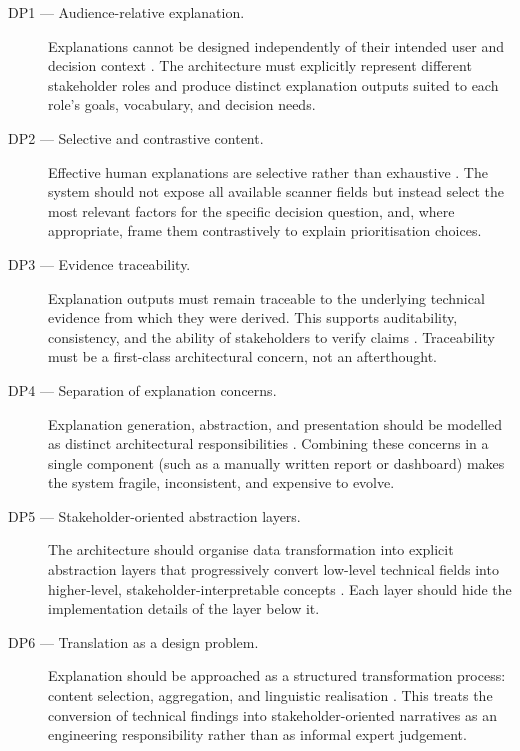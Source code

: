 \begin{description}

  \item[DP1 — Audience-relative explanation.] Explanations cannot be designed independently of their intended user and decision context \cite{doshivelez2017rigorous, lipton2018mythos}. The architecture must explicitly represent different stakeholder roles and produce distinct explanation outputs suited to each role's goals, vocabulary, and decision needs.

  \item[DP2 — Selective and contrastive content.] Effective human explanations are selective rather than exhaustive \cite{miller2019explanation}. The system should not expose all available scanner fields but instead select the most relevant factors for the specific decision question, and, where appropriate, frame them contrastively to explain prioritisation choices.

  \item[DP3 — Evidence traceability.] Explanation outputs must remain traceable to the underlying technical evidence from which they were derived. This supports auditability, consistency, and the ability of stakeholders to verify claims \cite{bass2012software, wachter2017counterfactual}. Traceability must be a first-class architectural concern, not an afterthought.

  \item[DP4 — Separation of explanation concerns.] Explanation generation, abstraction, and presentation should be modelled as distinct architectural responsibilities \cite{parnas1972modules, bass2012software}. Combining these concerns in a single component (such as a manually written report or dashboard) makes the system fragile, inconsistent, and expensive to evolve.

  \item[DP5 — Stakeholder-oriented abstraction layers.] The architecture should organise data transformation into explicit abstraction layers that progressively convert low-level technical fields into higher-level, stakeholder-interpretable concepts \cite{kruchten1995viewmodel, barredo2020xai}. Each layer should hide the implementation details of the layer below it.

  \item[DP6 — Translation as a design problem.] Explanation should be approached as a structured transformation process: content selection, aggregation, and linguistic realisation \cite{reiter2000nlg, gatt2018survey}. This treats the conversion of technical findings into stakeholder-oriented narratives as an engineering responsibility rather than as informal expert judgement.


\end{description}
